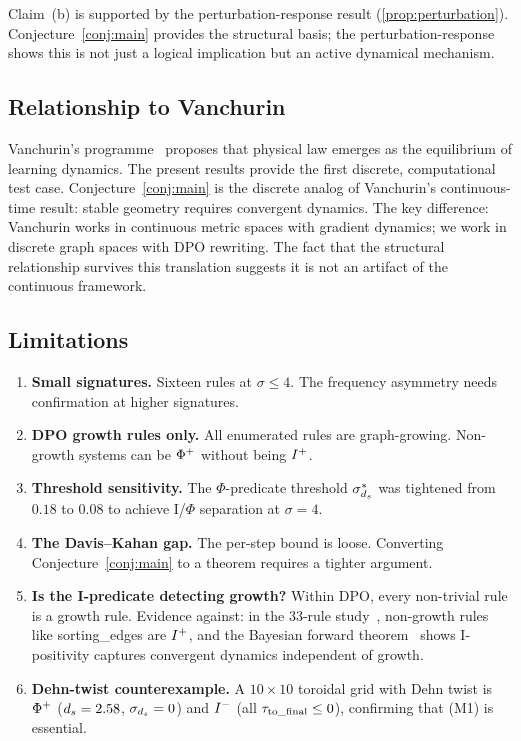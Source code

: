 \documentclass{../shared/primo}
\begin{document}
Claim~(b) is supported by the perturbation-response result (\cref{prop:perturbation}). Conjecture~\ref{conj:main} provides the structural basis; the perturbation-response shows this is not just a logical implication but an active dynamical mechanism.

\subsection{Relationship to Vanchurin}

Vanchurin's programme~\cite{vanchurin2020world,vanchurin2021theory,vanchurin2022evolution,vanchurin2025geometric} proposes that physical law emerges as the equilibrium of learning dynamics. The present results provide the first discrete, computational test case. Conjecture~\ref{conj:main} is the discrete analog of Vanchurin's continuous-time result: stable geometry requires convergent dynamics. The key difference: Vanchurin works in continuous metric spaces with gradient dynamics; we work in discrete graph spaces with DPO rewriting. The fact that the structural relationship survives this translation suggests it is not an artifact of the continuous framework.

\subsection{Limitations}

\begin{enumerate}
\item \textbf{Small signatures.} Sixteen rules at $\sigma \leq 4$. The frequency asymmetry needs confirmation at higher signatures.
\item \textbf{DPO growth rules only.} All enumerated rules are graph-growing. Non-growth systems can be $\Phi\textsuperscript{+}$ without being $I\textsuperscript{+}$.
\item \textbf{Threshold sensitivity.} The $\Phi$-predicate threshold $\sigma^*_{d_s}$ was tightened from $0.18$ to $0.08$ to achieve I/$\Phi$ separation at $\sigma = 4$.
\item \textbf{The Davis--Kahan gap.} The per-step bound is loose. Converting Conjecture~\ref{conj:main} to a theorem requires a tighter argument.
\item \textbf{Is the I-predicate detecting growth?} Within DPO, every non-trivial rule is a growth rule. Evidence against: in the 33-rule study~\cite{kowalczyk2026predicates}, non-growth rules like sorting\_edges are $I\textsuperscript{+}$, and the Bayesian forward theorem~\cite{kowalczyk2026bayesian} shows I-positivity captures convergent dynamics independent of growth.
\item \textbf{Dehn-twist counterexample.} A $10 \times 10$ toroidal grid with Dehn twist is $\Phi\textsuperscript{+}$ ($d_s = 2.58$, $\sigma_{d_s} = 0$) and $I\textsuperscript{$-$}$ (all $\tau_{\mathrm{to\_final}} \leq 0$), confirming that (M1) is essential.
\end{enumerate}
\end{document}
